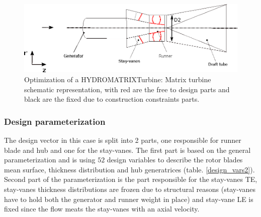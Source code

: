 \begin{figure}[h!]
\centering
\includegraphics[width=120mm]{gen_turb.eps}    
\caption{Optimization of a HYDROMATRIX\circledR Turbine: Matrix turbine schematic representation, with red are the free to design parts and black are the fixed due to construction constraints parts.  }
\label{Matrix_b}
\end{figure}

\subsubsection{Design parameterization}
The design vector in this case is split into 2 parts, one responsible for runner blade and hub and one for the stay-vanes. The first part is based on the general parameterization and is using $52$ design variables to describe the rotor blades mean surface, thickness distribution and hub generatrices (table. \ref{design_vars2}). Second part of the parameterization is the part responsible for the stay-vanes TE, stay-vanes thickness distributions are frozen due to structural reasons (stay-vanes have to hold both the generator and runner weight in place) and stay-vane LE is fixed since the flow meats the stay-vanes with an axial velocity.       

